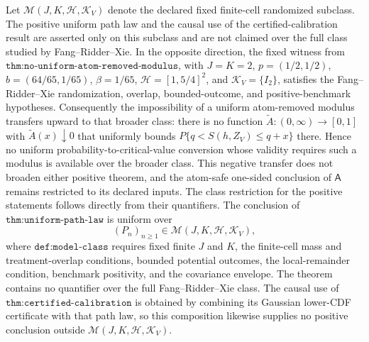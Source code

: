 Let \(\mathcal M(J,K,\mathcal H,\mathcal K_V)\) denote the declared fixed finite-cell randomized subclass.  The positive uniform path law and the causal use of the certified-calibration result are asserted only on this subclass and are not claimed over the full class studied by Fang--Ridder--Xie.  In the opposite direction, the fixed witness from \(\texttt{thm:no-uniform-atom-removed-modulus}\), with \(J=K=2\), \(p=(1/2,1/2)\), \(b=(64/65,1/65)\), \(\beta=1/65\), \(\mathcal H=[1,5/4]^2\), and \(\mathcal K_V=\{I_2\}\), satisfies the Fang--Ridder--Xie randomization, overlap, bounded-outcome, and positive-benchmark hypotheses.  Consequently the impossibility of a uniform atom-removed modulus transfers upward to that broader class: there is no function \(\widetilde A:(0,\infty)\to[0,1]\) with \(\widetilde A(x)\downarrow0\) that uniformly bounds \(P\{q<S(h,Z_V)\le q+x\}\) there.  Hence no uniform probability-to-critical-value conversion whose validity requires such a modulus is available over the broader class.  This negative transfer does not broaden either positive theorem, and the atom-safe one-sided conclusion of \(\mathsf A\) remains restricted to its declared inputs.
The class restriction for the positive statements follows directly from their quantifiers.  The conclusion of \(\texttt{thm:uniform-path-law}\) is uniform over
\[
 (P_n)_{n\geq 1}\in\mathcal M(J,K,\mathcal H,\mathcal K_V),
\]
where \(\texttt{def:model-class}\) requires fixed finite \(J\) and \(K\), the finite-cell mass and treatment-overlap conditions, bounded potential outcomes, the local-remainder condition, benchmark positivity, and the covariance envelope.  The theorem contains no quantifier over the full Fang--Ridder--Xie class.  The causal use of \(\texttt{thm:certified-calibration}\) is obtained by combining its Gaussian lower-CDF certificate with that path law, so this composition likewise supplies no positive conclusion outside \(\mathcal M(J,K,\mathcal H,\mathcal K_V)\).

